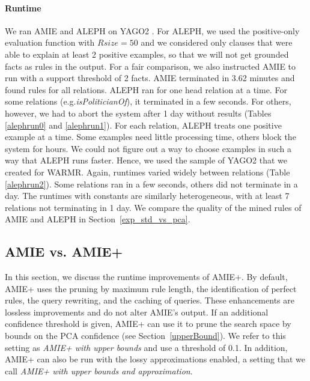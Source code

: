 {\paragraph{Runtime}
We ran AMIE and ALEPH on YAGO2 \cite{yago2}. For ALEPH, we used the positive-only evaluation function with $Rsize=50$ and we considered only clauses that were able to explain at least 2 positive examples,
so that we will not get grounded facts as rules in the output.
For a fair comparison, we also instructed AMIE to run with a support threshold of 2 facts.
AMIE terminated in 3.62 minutes and found rules for all relations. ALEPH ran for one head relation at a time. For some relations (e.g.\emph{isPoliticianOf}),
it terminated in a few seconds.
For others, however, we had to abort the system after 1 day without results (Tables \ref{alephrun0} and \ref{alephrun1}).
For each relation, ALEPH treats one positive example at a time. Some examples need little processing time, others block the system for hours.
We could not figure out a way to choose examples in such a way that ALEPH runs faster.
Hence, we used the sample of YAGO2 that we created for WARMR.
Again, runtimes varied widely between relations (Table \ref{alephrun2}).
Some relations ran in a few seconds, others did not terminate in a day.
The runtimes with constants are similarly heterogeneous, with at least 7 relations not terminating in 1 day.
We compare the quality of the mined rules of AMIE and ALEPH in Section~\ref{exp_std_vs_pca}.
}%

\subsection{AMIE vs. AMIE+}\label{amiepm}

In this section, we discuss the runtime improvements of AMIE+.
By default, AMIE+ uses the pruning by maximum rule length, the identification of perfect rules, the query rewriting, and the
caching of queries. These enhancements are lossless improvements and do not alter AMIE's output. If an additional confidence threshold is given, AMIE+ can use it to prune the search space by bounds on the PCA confidence (see Section~\ref{upperBound}). We refer to this setting as \emph{AMIE+ with upper bounds} and use a threshold of 0.1. In addition, AMIE+ can also be run with the lossy approximations enabled, a setting that we call \emph{AMIE+ with upper bounds and approximation}.

